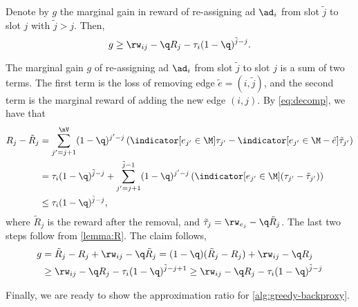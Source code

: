 \begin{lemmaE}\label{lemma:LB}
	Denote by $g$ the marginal gain in reward of re-assigning ad $\ad_i$ from slot $\tilde{j}$ to slot $j$ with $\tilde{j} > j$.
	Then,
	\[
		g \ge \rw_{ij} -\q R_j - \tau_{i} (1-\q)^{\tilde{j}-j}.
	\]
\end{lemmaE}
\begin{proofE}
	The marginal gain $g$ of re-assigning ad $\ad_i$ from slot $\tilde{j}$ to slot $j$ is a sum of two terms.
	The first term is the loss of removing edge $\tilde{e} = (i,\tilde{j})$, and
	the second term is the marginal reward of adding the new edge $(i,j)$.
	By \cref{eq:decomp}, we have that 
	\begin{align*}
		R_j - \tilde{R}_j 
		&= \sum_{j'=j+1}^{\nV}  (1-\q)^{j'-j} \left( 
			\indicator[e_{j'} \in \M] \tau_{j'}
			- \indicator[e_{j'} \in \M - \tilde{e}] \tilde{\tau}_{j'}
		\right) \\
		&= \tau_{i} (1-\q)^{\tilde{j}-j} +
		\sum_{j'=j+1}^{\tilde{j}-1}  (1-\q)^{j'-j} \left( 
		\indicator[e_{j'} \in \M] (\tau_{j'} - \tilde{\tau}_{j'})
		\right) \\
		&\le \tau_{i} (1-\q)^{\tilde{j}-j} 
		,
	\end{align*}
	where $\tilde{R}_j$ is the reward after the removal, and 
	$\tilde{\tau}_{j} = \rw_{e_{j}} - \q \tilde{R}_{j}$.
	The last two steps follow from \cref{lemma:R}.
	The claim follows,
	\begin{align*}
		g &= \tilde{R}_j - R_j + \rw_{ij} -\q \tilde{R}_j 
		= (1-\q) (\tilde{R}_j - R_j) + \rw_{ij} -\q R_j \\
		&\ge \rw_{ij} -\q R_j - \tau_{i} (1-\q)^{\tilde{j}-j+1}
		\ge \rw_{ij} -\q R_j - \tau_{i} (1-\q)^{\tilde{j}-j}
	\end{align*}
\end{proofE}


Finally, we are ready to show the approximation ratio for \cref{alg:greedy-backproxy}.


